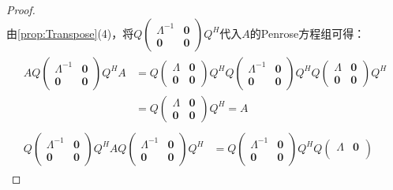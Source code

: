 \begin{proof}
\begin{equation*}
	\end{equation*}
	由\cref{prop:Transpose}(4)，将$Q
	\begin{pmatrix}
		\varLambda^{-1} & \mathbf{0} \\
		\mathbf{0} & \mathbf{0}
	\end{pmatrix}Q^H$代入$A$的Penrose方程组可得：
	\begin{gather*}
		\begin{aligned}
			AQ
			\begin{pmatrix}
				\varLambda^{-1} & \mathbf{0} \\
				\mathbf{0} & \mathbf{0}
			\end{pmatrix}Q^HA
			&=Q
			\begin{pmatrix}
				\varLambda & \mathbf{0} \\
				\mathbf{0} & \mathbf{0}
			\end{pmatrix}
			Q^HQ
			\begin{pmatrix}
				\varLambda^{-1} & \mathbf{0} \\
				\mathbf{0} & \mathbf{0}
			\end{pmatrix}
			Q^HQ
			\begin{pmatrix}
				\varLambda & \mathbf{0} \\
				\mathbf{0} & \mathbf{0}
			\end{pmatrix}
			Q^H \\
			&=Q
			\begin{pmatrix}
				\varLambda & \mathbf{0} \\
				\mathbf{0} & \mathbf{0}
			\end{pmatrix}
			Q^H
			=A
		\end{aligned} \\
		\begin{aligned}
			Q
			\begin{pmatrix}
				\varLambda^{-1} & \mathbf{0} \\
				\mathbf{0} & \mathbf{0}
			\end{pmatrix}
			Q^HAQ
			\begin{pmatrix}
				\varLambda^{-1} & \mathbf{0} \\
				\mathbf{0} & \mathbf{0}
			\end{pmatrix}
			Q^H
			&=Q
			\begin{pmatrix}
				\varLambda^{-1} & \mathbf{0} \\
				\mathbf{0} & \mathbf{0}
			\end{pmatrix}
			Q^HQ
			\begin{pmatrix}
				\varLambda & \mathbf{0} \\

\end{pmatrix}
\end{aligned}
\end{gather*}
\end{proof}
